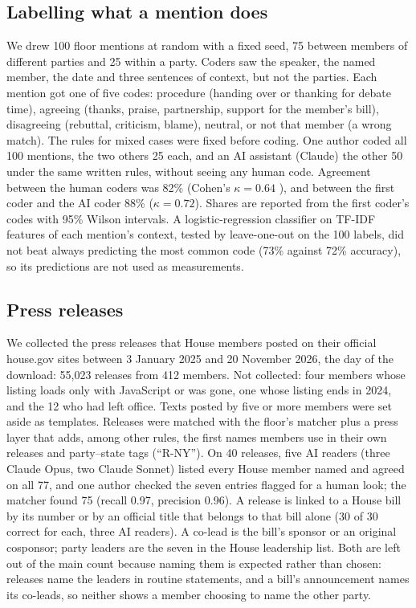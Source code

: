 \documentclass[9pt,twocolumn,twoside]{pnas-new}
\begin{document}
{\subsection*{Labelling what a mention does}
We drew 100 floor mentions at random with a fixed seed, 75 between members of different parties and 25 within a
party. Coders saw the speaker, the named member, the date and three sentences of context, but not the parties. Each
mention got one of five codes: procedure (handing over or thanking for debate time), agreeing (thanks, praise,
partnership, support for the member's bill), disagreeing (rebuttal, criticism, blame), neutral, or not that member (a
wrong match). The rules for mixed cases were fixed before coding. One author coded all 100 mentions, the two others
25 each, and an AI assistant (Claude) the other 50 under the same written rules, without seeing any human code.
Agreement between the human coders was 82\% (Cohen's $\kappa = 0.64$ \cite{cohen1960}), and between the first coder
and the AI coder 88\% ($\kappa = 0.72$). Shares are reported from the first coder's codes with 95\% Wilson intervals.
A logistic-regression classifier on TF-IDF features of each mention's context, tested by leave-one-out on the 100
labels, did not beat always predicting the most common code (73\% against 72\% accuracy), so its predictions are not
used as measurements.

\subsection*{Press releases}
We collected the press releases that House members posted on their official house.gov sites between 3 January 2025
and 20 November 2026, the day of the download: 55,023 releases from 412 members. Not collected: four members whose
listing loads only with JavaScript or was gone, one whose listing ends in 2024, and the 12 who had left office. Texts
posted by five or more members were set aside as templates. Releases were matched with the floor's matcher plus a
press layer that adds, among other rules, the first names members use in their own releases and party--state tags
(``R-NY''). On 40 releases, five AI readers (three Claude Opus, two Claude Sonnet) listed every House member named and agreed on all 77, and
one author checked the seven entries flagged for a human look; the matcher found 75 (recall 0.97, precision 0.96). A
release is linked to a House bill by its number or by an official title that belongs to that bill alone (30 of 30
correct for each, three AI readers). A co-lead is the bill's sponsor or an original cosponsor; party leaders are the seven in the House leadership list. Both are left out of the main count because naming them is
expected rather than chosen: releases name the leaders in routine statements, and a bill's announcement names its
co-leads, so neither shows a member choosing to name the other party.

}
\end{document}
